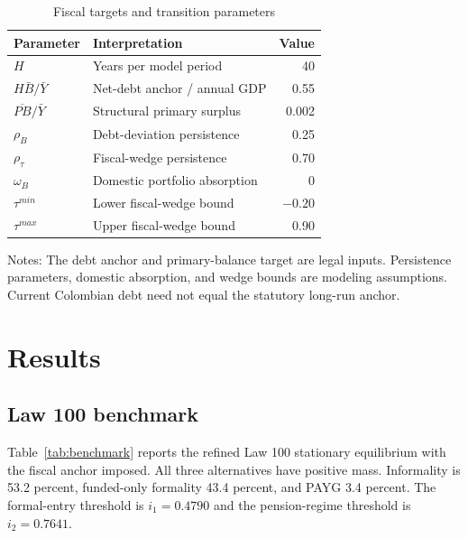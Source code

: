 \documentclass[12pt]{article}
\newcommand{\1}{\mathbf{1}}
\begin{document}
\begin{table}[htbp]\centering
\caption{Fiscal targets and transition parameters}\label{tab:fiscalparams}
\begin{tabular}{llr}
\toprule Parameter&Interpretation&Value\\ \midrule
$H$&Years per model period&40\\
$H\bar B/\bar Y$&Net-debt anchor / annual GDP&0.55\\
$\overline{PB}/\bar Y$&Structural primary surplus&0.002\\
$\rho_B$&Debt-deviation persistence&0.25\\
$\rho_\tau$&Fiscal-wedge persistence&0.70\\
$\omega_B$&Domestic portfolio absorption&0\\
$\tau^{min}$&Lower fiscal-wedge bound&$-0.20$\\
$\tau^{max}$&Upper fiscal-wedge bound&0.90\\
\bottomrule
\end{tabular}
\begin{flushleft}\footnotesize
Notes: The debt anchor and primary-balance target are legal inputs. Persistence parameters,
domestic absorption, and wedge bounds are modeling assumptions. Current Colombian debt need
not equal the statutory long-run anchor.
\end{flushleft}
\end{table}

\section{Results}

\subsection{Law 100 benchmark}

Table~\ref{tab:benchmark} reports the refined Law 100 stationary equilibrium with the fiscal
anchor imposed. All three alternatives have positive mass. Informality is 53.2 percent,
funded-only formality 43.4 percent, and PAYG 3.4 percent. The formal-entry threshold is
$i_1=0.4790$ and the pension-regime threshold is $i_2=0.7641$.
\end{document}
